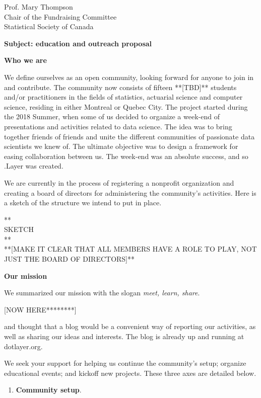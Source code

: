 \documentclass[11pt, a4paper]{letter} %
\begin{document}
\begin{letter}{
	Prof. Mary Thompson\\
	Chair of the Fundraising Committee\\
	Statistical Society of Canada
	
	\bigskip
	\textbf{Subject: education and outreach proposal}%
}
\noindent \textbf{Who we are}

We define ourselves as an open community, looking forward for anyone to join in and contribute. The community now consists of fifteen **[TBD]** students and/or practitioners in the fields of statistics, actuarial science and computer science, residing in either Montreal or Quebec City. The project started during the 2018 Summer, when some of us decided to organize a week-end of presentations and activities related to data science. The idea was to bring together friends of friends and unite the different communities of passionate data scientists we knew of. The ultimate objective was to design a framework for easing collaboration between us. The week-end was an absolute success, and so .Layer was created.

We are currently in the process of registering a nonprofit organization and creating a board of directors for administering the community's activities. Here is a sketch of the structure we intend to put in place.

**\\

SKETCH\\

**\\

**[MAKE IT CLEAR THAT ALL MEMBERS HAVE A ROLE TO PLAY, NOT JUST THE BOARD OF DIRECTORS]**


\noindent \textbf{Our mission}

We summarized our mission with the slogan \emph{meet, learn, share}. 

\bigskip

[NOW HERE********]

\bigskip

and thought that a blog would be a convenient way of reporting our activities, as well as sharing our ideas and interests. The blog is already up and running at dotlayer.org. 

We seek your support for helping us continue the community's setup; organize educational events; and kickoff new projects. These three axes are detailed below.

\begin{enumerate}
	\item \textbf{Community setup}.
	

\end{enumerate}
\end{letter}
\end{document}

